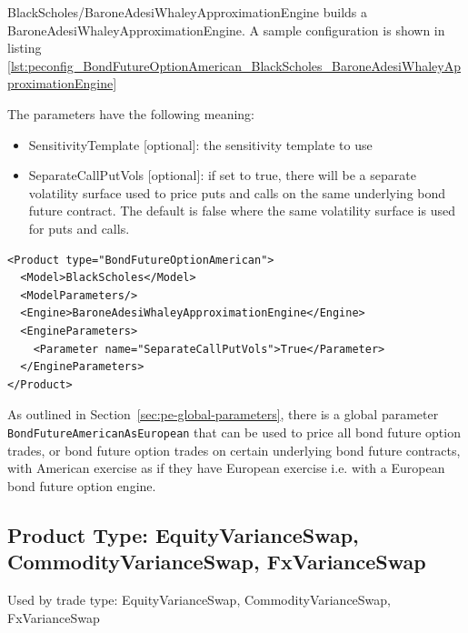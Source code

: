 BlackScholes/BaroneAdesiWhaleyApproximationEngine builds a BaroneAdesiWhaleyApproximationEngine. A sample configuration is 
shown in listing \ref{lst:peconfig_BondFutureOptionAmerican_BlackScholes_BaroneAdesiWhaleyApproximationEngine}

The parameters have the following meaning:

\begin{itemize}
\item SensitivityTemplate [optional]: the sensitivity template to use
\item SeparateCallPutVols [optional]: if set to true, there will be a separate volatility surface 
    used to price puts and calls on the same underlying bond future contract. The default is false 
    where the same volatility surface is used for puts and calls.
\end{itemize}

\begin{longlisting}
\begin{verbatim}
<Product type="BondFutureOptionAmerican">
  <Model>BlackScholes</Model>
  <ModelParameters/>
  <Engine>BaroneAdesiWhaleyApproximationEngine</Engine>
  <EngineParameters>
    <Parameter name="SeparateCallPutVols">True</Parameter>
  </EngineParameters>
</Product>
\end{verbatim}
\caption{Configuration for Product BondFutureOptionAmerican, Model BlackScholes, Engine BaroneAdesiWhaleyApproximationEngine}
\label{lst:peconfig_BondFutureOptionAmerican_BlackScholes_BaroneAdesiWhaleyApproximationEngine}
\end{longlisting}

As outlined in Section~\ref{sec:pe-global-parameters}, there is a global parameter \lstinline!BondFutureAmericanAsEuropean! 
that can be used to price all bond future option trades, or bond future option trades on certain underlying bond future 
contracts, with American exercise as if they have European exercise i.e. with a European bond future option engine.

\subsection{Product Type: EquityVarianceSwap, CommodityVarianceSwap, FxVarianceSwap}

Used by trade type: EquityVarianceSwap, CommodityVarianceSwap, FxVarianceSwap

